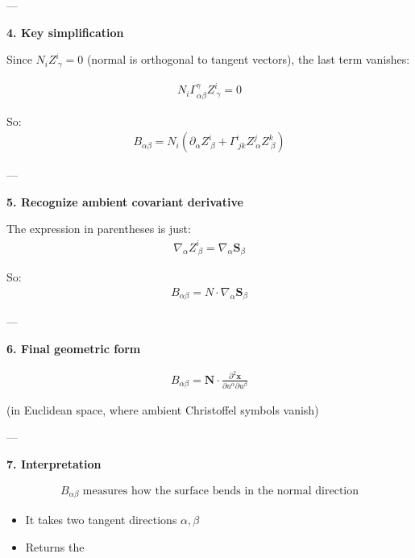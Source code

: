 \documentclass[12pt,a4paper]{report}
\begin{document}
\begin{description}
\begin{description}
\begin{description}
---

\item \textbf{4. Key simplification}

Since $N_i Z^i_{\ \gamma} = 0$ (normal is orthogonal to tangent vectors), the last term vanishes:

\begin{align*}
N_i \Gamma^\gamma_{\alpha\beta} Z^i_{\ \gamma} = 0
\end{align*}

So:
\begin{align*}
B_{\alpha\beta} = N_i \left( \partial_\alpha Z^i_{\ \beta} + \Gamma^i_{\ jk} Z^j_{\ \alpha} Z^k_{\ \beta} \right)
\end{align*}

---

\item \textbf{5. Recognize ambient covariant derivative}

The expression in parentheses is just:
\begin{align*}
\nabla_\alpha Z^i_{\ \beta} = \nabla_\alpha \mathbf{S}_\beta
\end{align*}

So:
\begin{align*}
\boxed{
B_{\alpha\beta} = N \cdot \nabla_\alpha \mathbf{S}_\beta }
\end{align*}

---

\item \textbf{6. Final geometric form}

\begin{align*}
\boxed{
B_{\alpha\beta} = \mathbf{N} \cdot \frac{\partial^2 \mathbf{x}}{\partial u^\alpha \partial u^\beta} }
\end{align*}

(in Euclidean space, where ambient Christoffel symbols vanish)

---

\item \textbf{7. Interpretation}

\begin{align*}
\boxed{
B_{\alpha\beta}
\text{ measures how the surface bends in the normal direction}
}
\end{align*}

\begin{itemize}
\item It takes two tangent directions $\alpha,\beta$
\item Returns the 
\end{itemize}


\end{description}
\end{description}
\end{description}
\end{document}
